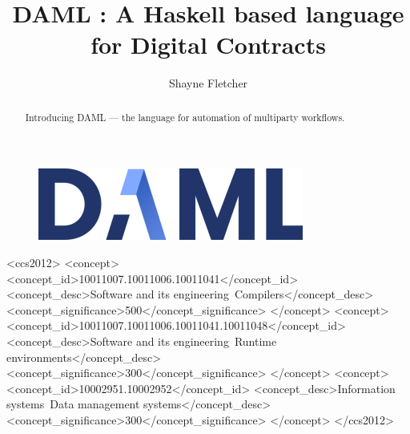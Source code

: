\documentclass[acmsmall]{acmart}
\begin{document}
\title{DAML : A Haskell based language for Digital Contracts}

%
\author{Shayne Fletcher}

\renewcommand{\shortauthors}{Shayne Fletcher}

\begin{figure}[H]
\centering
\includegraphics{img/DAML_330x89.png}
\end{figure}

\begin{abstract}
Introducing DAML --- the language for automation of multiparty workflows.
\end{abstract}

%
%
\begin{CCSXML}
<ccs2012>
<concept>
<concept_id>10011007.10011006.10011041</concept_id>
<concept_desc>Software and its engineering~Compilers</concept_desc>
<concept_significance>500</concept_significance>
</concept>
<concept>
<concept_id>10011007.10011006.10011041.10011048</concept_id>
<concept_desc>Software and its engineering~Runtime environments</concept_desc>
<concept_significance>300</concept_significance>
</concept>
<concept>
<concept_id>10002951.10002952</concept_id>
<concept_desc>Information systems~Data management systems</concept_desc>
<concept_significance>300</concept_significance>
</concept>
</ccs2012>
\end{CCSXML}

\end{document}
